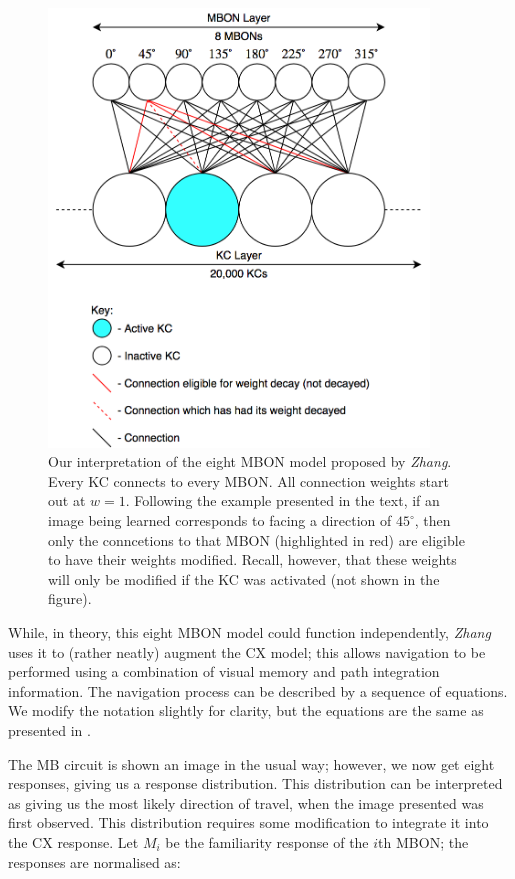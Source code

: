 \documentclass[a4paper,11pt,twoside,openright]{article}
\begin{document}
\begin{figure}[h!]
  \centering
  \includegraphics[width=0.9\textwidth]{EightENModel}
  \caption{\label{fig:eightmbon} Our interpretation of the eight MBON model
    proposed by \textit{Zhang}. Every KC connects to every MBON. All connection
    weights start out at $w=1$. Following the example presented in the text,
    if an image being learned corresponds to facing a direction of $45^{\circ}$,
    then only the conncetions to that MBON (highlighted in red) are eligible to
    have their weights modified. Recall, however, that these weights will only
    be modified if the KC was activated (not shown in the figure).
    }
\end{figure}

While, in theory, this eight MBON model could function independently,
\textit{Zhang} uses it to (rather neatly) augment the CX model; this allows
navigation to be performed using a combination of visual memory and path
integration information. The navigation process can be described by a sequence
of equations. We modify the notation slightly for clarity, but the
equations are the same as presented in \cite{Zhang2017}.
\newline
\par

The MB circuit is shown an image in the usual way; however, we now
get eight responses, giving us a response distribution. This distribution can
be interpreted as giving us the most likely direction of travel, when the image
presented was first observed. This distribution requires some modification to
integrate it into the CX response. Let $M_i$ be the familiarity response of the
$i$th MBON; the responses are normalised as:
\end{document}
